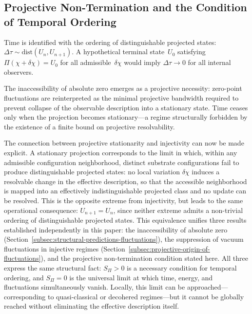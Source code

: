 \subsection{Projective Non-Termination and the Condition of Temporal Ordering}
  \label{subsec:projective-non-termination}

  Time is identified with the ordering of distinguishable projected states: $\Delta \tau \sim \mathrm{dist}(U_n, U_{n+1})$.
  A hypothetical terminal state~$U_0$ satisfying $\Pi(\chi + \delta\chi) = U_0$ for all admissible~$\delta\chi$ would
  imply $\Delta\tau \rightarrow 0$ for all internal observers.

  The inaccessibility of absolute zero emerges as a projective necessity:
  zero-point fluctuations are reinterpreted as the minimal projective
  bandwidth required to prevent collapse of the observable description into a stationary state.
  Time ceases only when the projection becomes stationary---a regime
  structurally forbidden by the existence of a finite bound on projective resolvability.

  The connection between projective stationarity and injectivity can now be made explicit.
  A stationary projection corresponds to the limit in which, within any admissible
  configuration neighborhood, distinct substrate configurations fail to produce
  distinguishable projected states: no local variation $\delta\chi$ induces a resolvable
  change in the effective description, so that the accessible neighborhood is mapped into an effectively
  indistinguishable projected class and no update can be resolved.
  This is the opposite extreme from injectivity, but leads to the same operational
  consequence: $U_{n+1} = U_n$, since neither extreme admits a non-trivial ordering of
  distinguishable projected states.
  This equivalence unifies three results established independently in this paper:
  the inaccessibility of absolute zero (Section~\ref{subsec:structural-predictions-fluctuations}),
  the suppression of vacuum fluctuations in injective regimes (Section~\ref{subsec:projective-origin-of-fluctuations}),
  and the projective non-termination condition stated here.
  All three express the same structural fact: $S_\Pi > 0$ is a necessary condition
  for temporal ordering, and $S_\Pi = 0$ is the universal limit at which time, energy,
  and fluctuations simultaneously vanish.
  Locally, this limit can be approached---corresponding to quasi-classical or
  decohered regimes---but it cannot be globally reached without eliminating the effective description itself.
